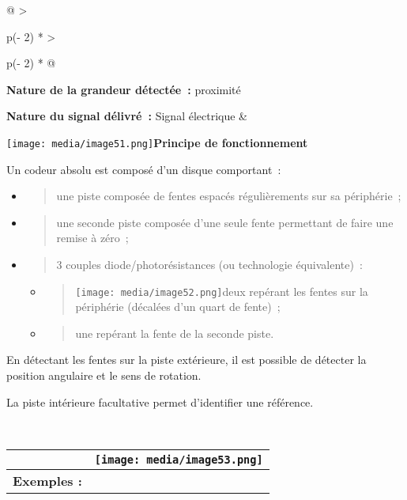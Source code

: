 \documentclass[
]{article}
\begin{document}
\begin{longtable}[]{@{}
  >{\raggedright\arraybackslash}p{(\columnwidth - 2\tabcolsep) * }
  >{\raggedright\arraybackslash}p{(\columnwidth - 2\tabcolsep) * }@{}}
\toprule
\textbf{Nature de la grandeur détectée~:} proximité

\textbf{Nature du signal délivré~:} Signal électrique &
\begin{minipage}[b]{\linewidth}\raggedright
\texttt{[image: media/image51.png]}\textbf{Principe
de fonctionnement}

Un codeur absolu est composé d'un disque comportant~:

\begin{itemize}
\item
  \begin{quote}
  une piste composée de fentes espacés régulièrements sur sa
  périphérie~;
  \end{quote}
\item
  \begin{quote}
  une seconde piste composée d'une seule fente permettant de faire une
  remise à zéro~;
  \end{quote}
\item
  \begin{quote}
  3 couples diode/photorésistances (ou technologie équivalente)~:
  \end{quote}

  \begin{itemize}
  \item
    \begin{quote}
    \texttt{[image: media/image52.png]}deux
    repérant les fentes sur la périphérie (décalées d'un quart de
    fente)~;
    \end{quote}
  \item
    \begin{quote}
    une repérant la fente de la seconde piste.
    \end{quote}
  \end{itemize}
\end{itemize}

En détectant les fentes sur la piste extérieure, il est possible de
détecter la position angulaire et le sens de rotation.

La piste intérieure facultative permet d'identifier une référence.
\end{minipage} \\
\midrule
\endhead
\begin{minipage}[t]{\linewidth}\raggedright
\begin{longtable}[]{@{}
  >{\raggedright\arraybackslash}p{}
  >{\raggedright\arraybackslash}p{}@{}}
\toprule
& \texttt{[image: media/image53.png]} \\
\midrule
\endhead
\textbf{Exemples :}


\end{longtable}
\end{minipage}
\end{longtable}
\end{document}
